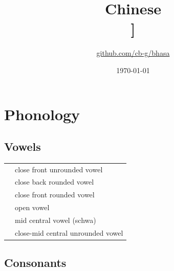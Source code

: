 \documentclass{article}
\title{Chinese\\\ipa{[\t{\:t\:s}UNw@n}]}
\author{\href{https://github.com/cb-g/bhasa}{github.com/cb-g/bhasa}}
\date{\today}
\begin{document}
\pagecolor{custom_bg}\color{custom_fg}
\maketitle\thispagestyle{empty}

\newpage\setcounter{page}{1}\section{Phonology}

\subsection{Vowels}

\begin{xltabular}{\textwidth}{lL}
   & close front unrounded vowel \\
   & close back rounded vowel \\
   & close front rounded vowel \\
   & open vowel \\
   & mid central vowel (schwa) \\
  \ipa{\textrevepsilon} & close-mid central unrounded vowel \\
\end{xltabular}

\subsection{Consonants}
\end{document}
